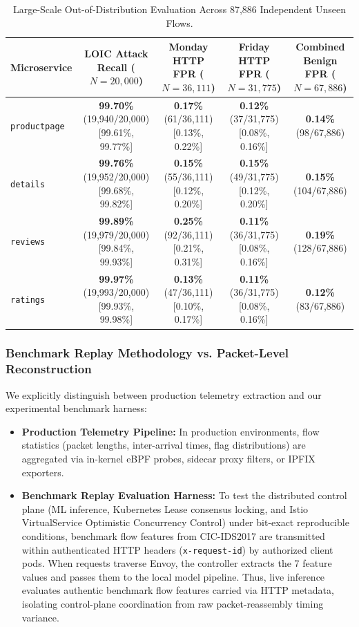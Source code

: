 \begin{table}[t]
\centering
\caption{Large-Scale Out-of-Distribution Evaluation Across 87,886 Independent Unseen Flows.}
\label{tab:out_of_distribution_results}
\begin{tabular}{lcccc}
\hline
\textbf{Microservice} & \textbf{LOIC Attack Recall ($N = 20,000$)} & \textbf{Monday HTTP FPR ($N = 36,111$)} & \textbf{Friday HTTP FPR ($N = 31,775$)} & \textbf{Combined Benign FPR ($N = 67,886$)} \\
\hline
\texttt{productpage} & \textbf{99.70\%} (19,940/20,000) [99.61\%, 99.77\%] & \textbf{0.17\%} (61/36,111) [0.13\%, 0.22\%] & \textbf{0.12\%} (37/31,775) [0.08\%, 0.16\%] & \textbf{0.14\%} (98/67,886) \\
\texttt{details}     & \textbf{99.76\%} (19,952/20,000) [99.68\%, 99.82\%] & \textbf{0.15\%} (55/36,111) [0.12\%, 0.20\%] & \textbf{0.15\%} (49/31,775) [0.12\%, 0.20\%] & \textbf{0.15\%} (104/67,886) \\
\texttt{reviews}     & \textbf{99.89\%} (19,979/20,000) [99.84\%, 99.93\%] & \textbf{0.25\%} (92/36,111) [0.21\%, 0.31\%] & \textbf{0.11\%} (36/31,775) [0.08\%, 0.16\%] & \textbf{0.19\%} (128/67,886) \\
\texttt{ratings}     & \textbf{99.97\%} (19,993/20,000) [99.93\%, 99.98\%] & \textbf{0.13\%} (47/36,111) [0.10\%, 0.17\%] & \textbf{0.11\%} (36/31,775) [0.08\%, 0.16\%] & \textbf{0.12\%} (83/67,886) \\
\hline
\end{tabular}
\end{table}

\subsubsection{Benchmark Replay Methodology vs. Packet-Level Reconstruction}
We explicitly distinguish between production telemetry extraction and our experimental benchmark harness:
\begin{itemize}
    \item \textbf{Production Telemetry Pipeline:} In production environments, flow statistics (packet lengths, inter-arrival times, flag distributions) are aggregated via in-kernel eBPF probes, sidecar proxy filters, or IPFIX exporters.
    \item \textbf{Benchmark Replay Evaluation Harness:} To test the distributed control plane (ML inference, Kubernetes Lease consensus locking, and Istio VirtualService Optimistic Concurrency Control) under bit-exact reproducible conditions, benchmark flow features from CIC-IDS2017 are transmitted within authenticated HTTP headers (\texttt{x-request-id}) by authorized client pods. When requests traverse Envoy, the controller extracts the 7 feature values and passes them to the local model pipeline. Thus, live inference evaluates authentic benchmark flow features carried via HTTP metadata, isolating control-plane coordination from raw packet-reassembly timing variance.
\end{itemize}


